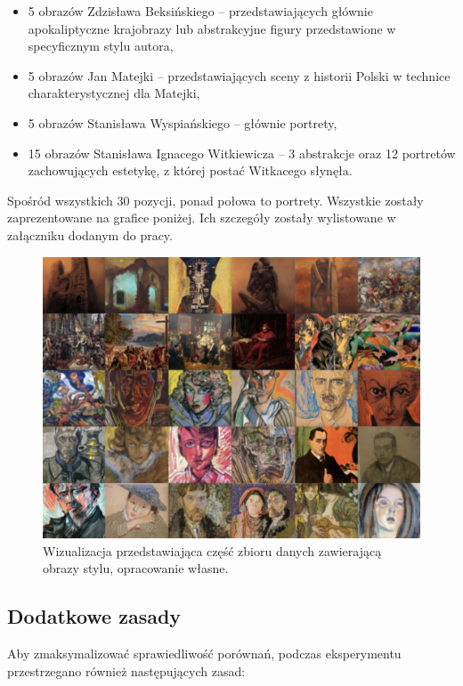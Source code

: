 \documentclass[12pt]{article}
\begin{document}
\begin{itemize}
    \item 5 obrazów Zdzisława Beksińskiego – przedstawiających głównie apokaliptyczne krajobrazy lub abstrakcyjne figury przedstawione w specyficznym stylu autora,
    \item 5 obrazów Jan Matejki – przedstawiających sceny z historii Polski w technice charakterystycznej dla Matejki,
    \item 5 obrazów Stanisława Wyspiańskiego – głównie portrety,
    \item 15 obrazów Stanisława Ignacego Witkiewicza – 3 abstrakcje oraz 12 portretów zachowujących estetykę, z której postać Witkacego słynęła.
\end{itemize}
Spośród wszystkich 30 pozycji, ponad połowa to portrety. Wszystkie zostały zaprezentowane na grafice poniżej. Ich szczegóły zostały wylistowane w załączniku dodanym do pracy.
\begin{figure}[H]
    \centering
    \includegraphics[width=\textwidth]{u12.png}
    \caption{Wizualizacja przedstawiająca część zbioru danych zawierającą obrazy stylu, opracowanie własne.}
    \label{fig:9}
\end{figure}

\subsection{Dodatkowe zasady}

\indent

Aby zmaksymalizować sprawiedliwość porównań, podczas eksperymentu przestrzegano również następujących zasad:
\end{document}
